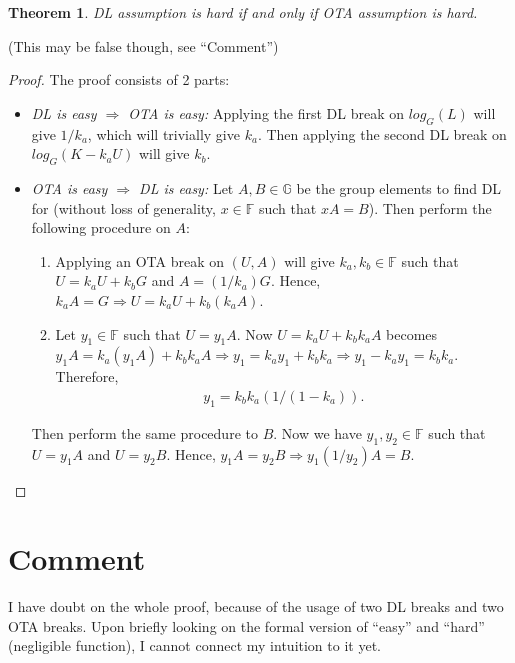 \documentclass{article}
\newtheorem{theorem}{Theorem}[section]
\begin{document}
\begin{theorem}
DL assumption is hard if and only if OTA assumption is hard.
\end{theorem}
(This may be false though, see ``Comment'')
\begin{proof}
The proof consists of 2 parts:
    \begin{itemize}
    \item \textit{DL is easy $\Rightarrow$ OTA is easy:} Applying the first DL break on $log_G(L)$ will give $1/k_a$, which will trivially give $k_a$. Then applying the second DL break on $log_G(K - k_a U)$ will give $k_b$.
    \item \textit{OTA is easy $\Rightarrow$ DL is easy:} Let $A, B\in\mathbb{G}$ be the group elements to find DL for (without loss of generality, $x\in\mathbb{F}$ such that $xA=B$). Then perform the following procedure on $A$:
        \begin{enumerate}
        \item Applying an OTA break on $(U, A)$ will give $k_a, k_b\in\mathbb{F}$ such that $U = k_a U + k_b G$ and $A = (1/k_a)G$. Hence, $k_a A = G \Rightarrow U = k_a U + k_b (k_a A)$.
        \item Let $y_1\in\mathbb{F}$ such that $U=y_1 A$. Now $U = k_a U + k_b k_a A$ becomes $y_1 A = k_a (y_1 A) + k_b k_a A \Rightarrow y_1 = k_a y_1 + k_b k_a \Rightarrow y_1 - k_a y_1 = k_b k_a$. Therefore,
        \begin{align*}
            y_1 = k_b k_a (1/(1 - k_a)).
        \end{align*}
        \end{enumerate}
Then perform the same procedure to $B$. Now we have $y_1, y_2\in\mathbb{F}$ such that $U=y_1 A$ and $U=y_2 B$. Hence, $y_1 A = y_2 B \Rightarrow  y_1(1/y_2) A = B$.
    \end{itemize}
\end{proof}
\section{Comment}
\noindent I have doubt on the whole proof, because of the usage of two DL breaks and two OTA breaks. Upon briefly looking on the formal version of ``easy'' and ``hard'' (negligible function), I cannot connect my intuition to it yet.

%
%
\end{document}
